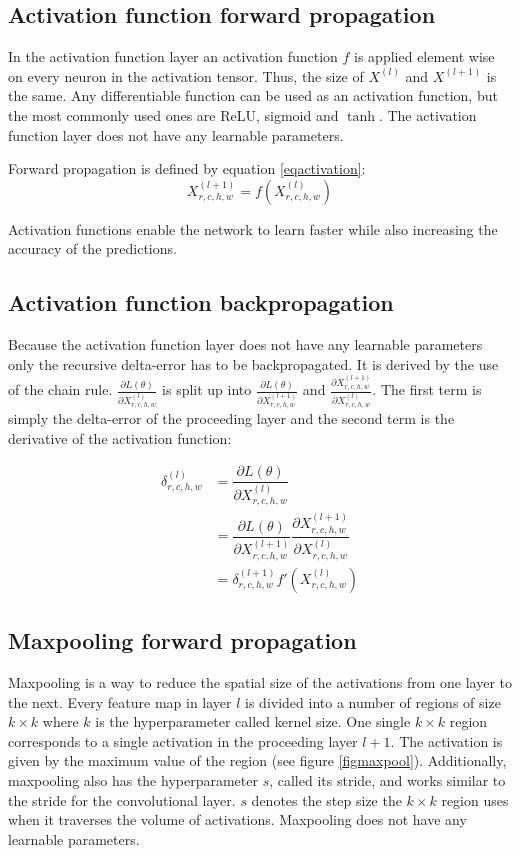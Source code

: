 \documentclass[a4paper, twoside]{article}
\newcommand*{\pd}[2]{\ensuremath{\dfrac{\partial #1}{\partial #2}}}
\newcommand*{\inpd}[2]{\ensuremath{\frac{\partial #1}{\partial #2}}}
\begin{document}
\subsection{Activation function forward propagation}
In the activation function layer an activation function $f$ is applied element wise on every neuron in the activation tensor. Thus, the size of $X^{(l)}$ and $X^{(l+1)}$ is the same. Any differentiable function can be used as an activation function, but the most commonly used ones are ReLU, sigmoid and $\tanh$. The activation function layer does not have any learnable parameters. \cite{convmath}
 
Forward propagation is defined by equation \eqref{eqactivation}:
\begin{equation}\label{eqactivation}
X^{(l+1)}_{r,c,h,w} = f(X^{(l)}_{r,c,h,w})
\end{equation}

Activation functions enable the network to learn faster while also increasing the accuracy of the predictions. \cite{cs231n}

\subsection{Activation function backpropagation}
Because the activation function layer does not have any learnable parameters only the recursive delta-error has to be backpropagated. It is derived by the use of the chain rule. $\inpd{L(\theta)}{X^{(l)}_{r,c,h,w}}$ is split up into $\inpd{L(\theta)}{X^{(l+1)}_{r,c,h,w}}$ and $\inpd{X^{(l+1)}_{r,c,h,w}}{X^{(l)}_{r,c,h,w}}$. The first term is simply the delta-error of the proceeding layer and the second term is the derivative of the activation function: \cite{cs231n} \cite{convmath}

\begin{equation}
\begin{split}
\delta^{(l)}_{r,c,h,w}
		& = \pd{L(\theta)}{X^{(l)}_{r,c,h,w}} \\
		& = \pd{L(\theta)}{X^{(l+1)}_{r,c,h,w}} \pd{X^{(l+1)}_{r,c,h,w}}{X^{(l)}_{r,c,h,w}} \\
		& = \delta^{(l+1)}_{r,c,h,w} f'(X^{(l)}_{r,c,h,w})
\end{split}
\end{equation}

\subsection{Maxpooling forward propagation}
Maxpooling is a way to reduce the spatial size of the activations from one layer to the next. Every feature map in layer $l$ is divided into a number of regions of size $k \times k$ where $k$ is the hyperparameter called kernel size. One single $k \times k$ region corresponds to a single activation in the proceeding layer $l+1$. The activation is given by the maximum value of the region (see figure \ref{figmaxpool}). Additionally, maxpooling also has the hyperparameter $s$, called its stride, and works similar to the stride for the convolutional layer. $s$ denotes the step size the $k \times k$ region uses when it traverses the volume of activations. Maxpooling does not have any learnable parameters. \cite{cs231n} \cite{convmath} \cite{convarithmetic}
\end{document}
